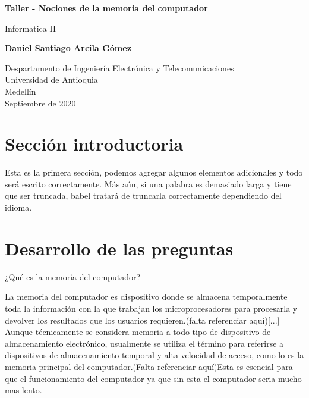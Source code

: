 \documentclass{article}
\begin{document}
\begin{titlepage}
    \begin{center}
        \vspace*{1cm}
            
        \Huge
        \textbf{Taller - Nociones de la memoria del computador}
            
        \vspace{0.5cm}
        \LARGE
        Informatica II
            
        \vspace{1.5cm}
            
        \textbf{Daniel Santiago Arcila Gómez}
            
        \vfill
            
        \vspace{0.8cm}
            
        \Large
        Despartamento de Ingeniería Electrónica y Telecomunicaciones\\
        Universidad de Antioquia\\
        Medellín\\
        Septiembre de 2020
            
    \end{center}
\end{titlepage}

\tableofcontents

\section{Sección introductoria}
Esta es la primera sección, podemos agregar algunos elementos adicionales y todo será escrito correctamente. Más aún, si una palabra es demasiado larga y tiene que ser truncada, babel tratará de truncarla correctamente dependiendo del idioma.

\section{Desarrollo de las preguntas} \label{contenido}

\begin{description}
\item[¿Qué es la memoría del computador?]
\end{description}

La memoria del computador es dispositivo donde se almacena temporalmente toda la información con la que trabajan los microprocesadores para procesarla y devolver los resultados que los usuarios requieren.(falta referenciar aquí)[...]
Aunque técnicamente se considera memoria a todo tipo de dispositivo de almacenamiento
electrónico, usualmente se utiliza el término para referirse a dispositivos de almacenamiento
temporal y alta velocidad de acceso, como lo es la memoria principal del computador.(Falta referenciar aquí)Esta es esencial para que el funcionamiento del computador ya que sin esta el computador seria mucho mas lento.
\end{document}
